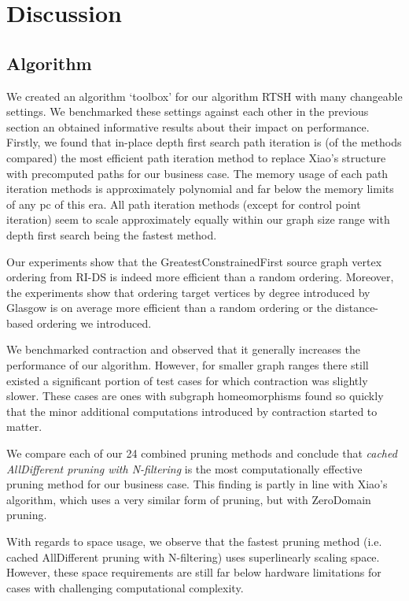 \chapter{Discussion}
\label{chapter:discussion}
\section{Algorithm}
We created an algorithm `toolbox' for our algorithm RTSH with many changeable settings. We benchmarked these settings against each other in the previous section an obtained informative results about their impact on performance. Firstly, we found that in-place depth first search path iteration is (of the methods compared) the most efficient path iteration method to replace Xiao's structure with precomputed paths for our business case. The memory usage of each path iteration methods is approximately polynomial and far below the memory limits of any pc of this era. All path iteration methods (except for control point iteration) seem to scale approximately equally within our graph size range with depth first search being the fastest method.

Our experiments show that the GreatestConstrainedFirst source graph vertex ordering from RI-DS \cite{RIalgorithm} is indeed more efficient than a random ordering. Moreover, the experiments show that ordering target vertices by degree introduced by Glasgow \cite{McCreesh2015} is on average more efficient than a random ordering or the distance-based ordering we introduced.

We benchmarked contraction and observed that it generally increases the performance of our algorithm. However, for smaller graph ranges there still existed a significant portion of test cases for which contraction was slightly slower. These cases are ones with subgraph homeomorphisms found so quickly that the minor additional computations introduced by contraction started to matter.

We compare each of our 24 combined pruning methods and conclude that \textit{cached AllDifferent pruning with N-filtering} is the most computationally effective pruning method for our business case. This finding is partly in line with Xiao's algorithm, which uses a very similar form of pruning, but with ZeroDomain pruning.

With regards to space usage, we observe that the fastest pruning method (i.e. cached AllDifferent pruning with N-filtering) uses superlinearly scaling space. However, these space requirements are still far below hardware limitations for cases with challenging computational complexity. 

